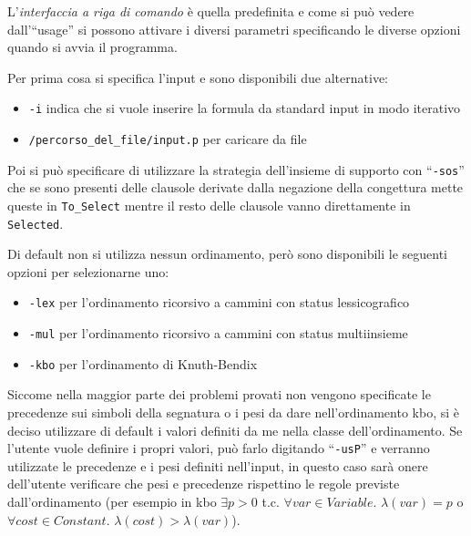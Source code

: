 \documentclass[a4paper,11pt]{article} %
\newcommand{\sintassi}{\texttt}
\newcommand{\campo}{\texttt}
\begin{document}
L'\emph{interfaccia a riga di comando}
è quella predefinita e come si può vedere dall'``usage''
si possono attivare i diversi parametri specificando le diverse opzioni quando
si avvia il programma.

Per prima cosa si specifica l'input e sono disponibili due alternative:
\vspace{-1ex}
\begin{itemize}
  \item{\sintassi{-i}} indica che si vuole inserire la formula da standard input in modo iterativo
\vspace{-1ex}
  \item{\sintassi{/percorso\_del\_file/input.p}} per caricare da file
\end{itemize}
\vspace{-1ex}

Poi si può specificare di utilizzare la strategia dell'insieme di supporto con 
``\sintassi{-sos}'' che se sono presenti delle clausole
derivate dalla negazione della congettura mette queste in \campo{To\_Select}
mentre il resto delle clausole vanno direttamente in \campo{Selected}.

Di default non si utilizza nessun ordinamento, però sono disponibili le seguenti 
opzioni per selezionarne uno:
\vspace{-1ex}
\begin{itemize}
  \item{\sintassi{-lex}} per l'ordinamento ricorsivo a cammini con status lessicografico
\vspace{-1ex}
  \item{\sintassi{-mul}} per l'ordinamento ricorsivo a cammini con status multiinsieme
\vspace{-1ex}
  \item{\sintassi{-kbo}} per l'ordinamento di Knuth-Bendix
\end{itemize}
\vspace{-1ex}
Siccome nella maggior parte dei problemi provati non vengono specificate le precedenze sui simboli
della segnatura o i pesi da dare nell'ordinamento kbo, si è deciso utilizzare di default 
i valori definiti da me nella classe dell'ordinamento. Se l'utente
vuole definire i propri valori, può farlo 
digitando ``\sintassi{-usP}'' e verranno utilizzate le precedenze e i pesi definiti 
nell'input, in questo caso sarà onere dell'utente verificare che pesi e precedenze rispettino
le regole previste dall'ordinamento (per esempio in kbo $\exists p>0$ t.c. $\forall var \in Variable.$
$\lambda(var) = p$ o 
$\forall cost \in Constant.$ $\lambda(cost)>\lambda(var)$).
\end{document}
